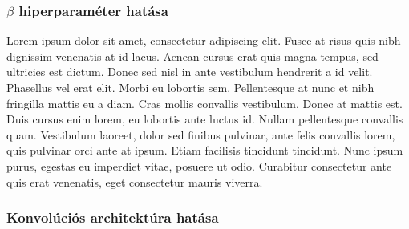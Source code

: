\documentclass[12pt]{article}
\begin{document}
\subsubsection{$\beta$ hiperparaméter hatása}

Lorem ipsum dolor sit amet, consectetur adipiscing elit. Fusce at risus quis nibh dignissim venenatis at id lacus. Aenean cursus erat quis magna tempus, sed ultricies est dictum. Donec sed nisl in ante vestibulum hendrerit a id velit. Phasellus vel erat elit. Morbi eu lobortis sem. Pellentesque at nunc et nibh fringilla mattis eu a diam. Cras mollis convallis vestibulum. Donec at mattis est. Duis cursus enim lorem, eu lobortis ante luctus id. Nullam pellentesque convallis quam. Vestibulum laoreet, dolor sed finibus pulvinar, ante felis convallis lorem, quis pulvinar orci ante at ipsum. Etiam facilisis tincidunt tincidunt. Nunc ipsum purus, egestas eu imperdiet vitae, posuere ut odio. Curabitur consectetur ante quis erat venenatis, eget consectetur mauris viverra.

\subsubsection{Konvolúciós architektúra hatása}
\end{document}
